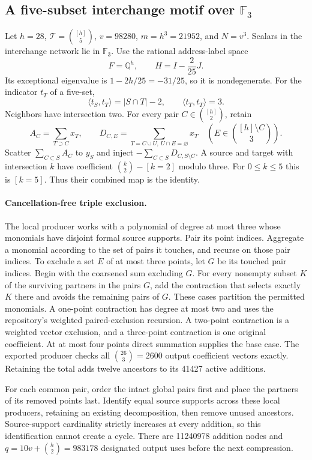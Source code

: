 \subsection{A five-subset interchange motif over $\mathbb F_3$}
Let $h=28$, $\mathcal T=\binom{[h]}5$, $v=98280$, $m=h^3=21952$,
and $N=v^3$. Scalars in the interchange network lie in $\mathbb F_3$.
Use the rational address-label space
\[
 F=\mathbb Q^h,\qquad H=I-\frac2{25}J.
\]
Its exceptional eigenvalue is $1-2h/25=-31/25$, so it is nondegenerate.
For the indicator $t_T$ of a five-set,
\[
 \langle t_S,t_T\rangle=|S\cap T|-2,\qquad
 \langle t_T,t_T\rangle=3.
\]
Neighbors have intersection two. For every pair $C\in\binom{[h]}2$, retain
\[
 A_C=\sum_{T\supset C}x_T,\qquad
 D_{C,E}=\sum_{T=C\cup U,\ U\cap E=\varnothing}x_T
 \quad\left(E\in\binom{[h]\setminus C}3\right).
\]
Scatter $\sum_{C\subset S}A_C$ to $y_S$ and inject
$-\sum_{C\subset S}D_{C,S\setminus C}$. A source and target with intersection
$k$ have coefficient $\binom{k}{2}-[k=2]$ modulo three. For $0\le k\le5$
this is $[k=5]$. Thus their combined map is the identity.

\paragraph{Cancellation-free triple exclusion.}
The local producer works with a polynomial of degree at most three whose
monomials have disjoint formal source supports. Pair its point indices.
Aggregate a monomial according to the set of pairs it touches, and recurse
on those pair indices. To exclude a set $E$ of at most three points, let $G$
be its touched pair indices. Begin with the coarsened sum excluding $G$.
For every nonempty subset $K$ of the surviving partners in the pairs $G$,
add the contraction that selects exactly $K$ there and avoids the remaining
pairs of $G$. These cases partition the permitted monomials.
A one-point contraction has degree at most two and uses the repository's
weighted paired-exclusion recursion. A two-point contraction is a weighted
vector exclusion, and a three-point contraction is one original coefficient.
At at most four points direct summation supplies the base case. The exported
producer checks all $\binom{26}3=2600$ output coefficient vectors exactly.
Retaining the total adds twelve ancestors to its 41427 active additions.

For each common pair, order the intact global pairs first and place the
partners of its removed points last. Identify equal source supports across
these local producers, retaining an existing decomposition, then remove
unused ancestors. Source-support cardinality strictly increases at every
addition, so this identification cannot create a cycle. There are 11240978
addition nodes and $q=10v+\binom h2=983178$ designated output uses before
the next compression.

